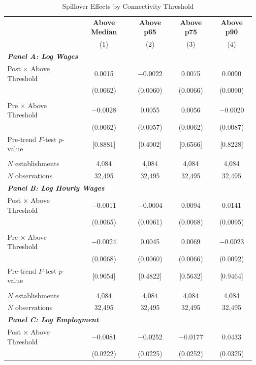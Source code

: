 \begin{table}[!htbp]
\centering
\caption{Spillover Effects by Connectivity Threshold}
\label{tab:conn_margins_thresholds}
\scriptsize
\begin{tabular}{lcccc}
\toprule\toprule
 & \textbf{Above Median} & \textbf{Above p65} & \textbf{Above p75} & \textbf{Above p90} \\
 & (1) & (2) & (3) & (4) \\
\midrule
\multicolumn{5}{l}{\textit{\textbf{Panel A: Log Wages}}} \\
\midrule
Post $\times$ Above Threshold & 0.0015 & $-$0.0022 & 0.0075 & 0.0090 \\
  & (0.0062) & (0.0060) & (0.0066) & (0.0090) \\
  & & & & \\
Pre $\times$ Above Threshold & $-$0.0028 & 0.0055 & 0.0056 & $-$0.0020 \\
  & (0.0062) & (0.0057) & (0.0062) & (0.0087) \\
Pre-trend $F$-test $p$-value & [0.8881] & [0.4002] & [0.6566] & [0.8228] \\
  & & & & \\
$N$ establishments & 4,084 & 4,084 & 4,084 & 4,084 \\
$N$ observations & 32,495 & 32,495 & 32,495 & 32,495 \\
\midrule
\multicolumn{5}{l}{\textit{\textbf{Panel B: Log Hourly Wages}}} \\
\midrule
Post $\times$ Above Threshold & $-$0.0011 & $-$0.0004 & 0.0094 & 0.0141 \\
  & (0.0065) & (0.0061) & (0.0068) & (0.0095) \\
  & & & & \\
Pre $\times$ Above Threshold & $-$0.0024 & 0.0045 & 0.0069 & $-$0.0023 \\
  & (0.0068) & (0.0060) & (0.0066) & (0.0092) \\
Pre-trend $F$-test $p$-value & [0.9054] & [0.4822] & [0.5632] & [0.9464] \\
  & & & & \\
$N$ establishments & 4,084 & 4,084 & 4,084 & 4,084 \\
$N$ observations & 32,495 & 32,495 & 32,495 & 32,495 \\
\midrule
\multicolumn{5}{l}{\textit{\textbf{Panel C: Log Employment}}} \\
\midrule
Post $\times$ Above Threshold & $-$0.0081 & $-$0.0252 & $-$0.0177 & 0.0433 \\
  & (0.0222) & (0.0225) & (0.0252) & (0.0325) \\

\end{tabular}
\end{table}
